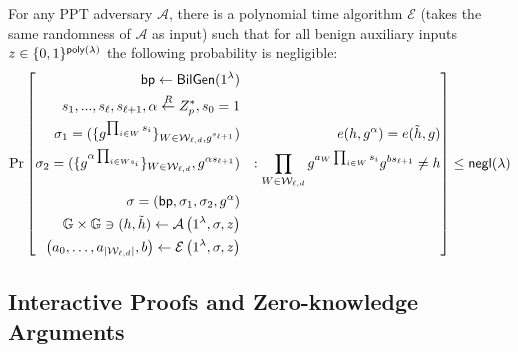 \begin{assumption}
	\label{asp::dlEPKE}
	For any PPT adversary $\mathcal{A}$, there is a polynomial time algorithm $\mathcal{E}$ (takes the same randomness of $\mathcal{A}$ as input) such that for all benign auxiliary inputs $z \in \{0,1\}^{{\sf poly}({\lambda})}$ the following probability is negligible:
	{
		\[\Pr\left[ \begin{aligned}
		\mathsf{bp} \leftarrow \mathsf{BilGen}(1^\lambda) && \\
		s_1, ..., s_\ell, s_{\ell + 1}, \alpha \overset{R}{\leftarrow} Z_{p}^*, s_0=1 && \\
		\sigma_1 = (\{g^{\prod_{i\in W}s_i}\}_{W\in \mathcal{W}_{\ell, d}, g^{s_{\ell+1}}}) &&\hspace*{10pt} e(h, g^\alpha)=e(\tilde{h}, g)\\
		\sigma_2 = (\{g^{\alpha\prod_{i\in Ws_i}}\}_{W\in \mathcal{W}_{\ell, d}}, g^{\alpha s_{\ell+1}}) && : \prod_{W\in \mathcal{W}_{\ell, d}}g^{a_{W}\prod_{i\in W}s_i}g^{b{s_{\ell+1}}}\neq h\\
		\sigma = (\mathsf{bp}, \sigma_1, \sigma_2, g^{\alpha}) && \\
		\mathbb{G} \times \mathbb{G} \ni (h, \tilde{h}) \leftarrow \mathcal{A} \left(1^{\lambda}, \sigma, z\right)&& \\
		\left( a _ { 0 } , \dots , a _ { \left| \mathcal { W } _ { \ell , d } \right| } , b \right) \leftarrow \mathcal { E } \left( 1 ^ { \lambda } , \sigma , z \right) &&
		\end{aligned}\right] \le {\sf negl}{(\lambda)}\]
	}
\end{assumption}



\subsection{Interactive Proofs and Zero-knowledge Arguments}

